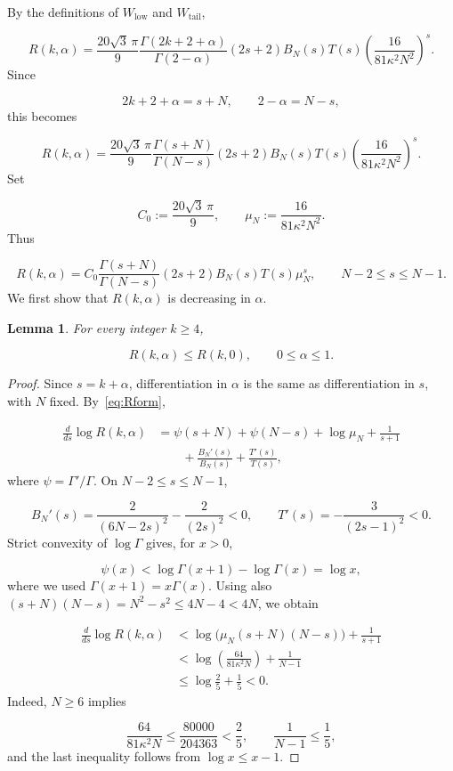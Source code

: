 \documentclass[11pt]{article}
\theoremstyle{plain}
\newtheorem{lemma}[theorem]{Lemma}
\theoremstyle{definition}
\theoremstyle{remark}
\begin{document}
By the definitions of $W_{\mathrm{low}}$ and $W_{\mathrm{tail}}$,

\[
  R(k,\alpha ) = \frac{20\sqrt{3}\, \pi }{9} \frac{\Gamma (2k+2+\alpha )}{\Gamma (2-\alpha )} (2s+2) B_N(s) T(s) \left( \frac{16}{81\kappa^{2}N^{2}} \right)^{s} .
\]
Since

\[
  2k+2+\alpha = s+N , \qquad  2-\alpha = N-s ,
\]
this becomes

\[
  R(k,\alpha ) = \frac{20\sqrt{3}\, \pi }{9} \frac{\Gamma (s+N)}{\Gamma (N-s)} (2s+2) B_N(s) T(s) \left( \frac{16}{81\kappa^{2}N^{2}} \right)^{s} .
\]
Set

\[
  C_{0} := \frac{20\sqrt{3}\, \pi }{9} , \qquad  \mu_N := \frac{16}{81\kappa^{2}N^{2}} .
\]
Thus

\begin{equation}\label{eq:Rform}
  R(k,\alpha ) = C_{0} \frac{\Gamma (s+N)}{\Gamma (N-s)} (2s+2) B_N(s) T(s) \mu_N^{s} , \qquad  N-2 \le s \le N-1 .
\end{equation}
We first show that $R(k,\alpha )$ is decreasing in $\alpha$.

\begin{lemma}\label{res:6.1}
For every integer $k \ge 4$,

\[
  R(k,\alpha ) \le R(k,0) , \qquad  0 \le \alpha \le 1 .
\]
\end{lemma}

\begin{proof}
Since $s = k+\alpha$, differentiation in $\alpha$ is the same as differentiation in $s$, with $N$ fixed. By~\eqref{eq:Rform},

\begin{align*}
  \frac{d}{ds}\log R(k,\alpha ) &= \psi (s+N) + \psi (N-s) + \log \mu_N + \frac{1}{s+1} \\
  &\qquad + \frac{B_N'(s)}{B_N(s)} + \frac{T'(s)}{T(s)} ,
\end{align*}
where $\psi = \Gamma '/\Gamma$. On $N-2 \le s \le N-1$,

\[
  B_N'(s) = \frac{2}{(6N-2s)^{2}} - \frac{2}{(2s)^{2}} < 0 , \qquad  T'(s) = -\frac{3}{(2s-1)^{2}} < 0 .
\]
Strict convexity of $\log \Gamma$ gives, for $x > 0$,

\[
  \psi (x) < \log \Gamma (x+1) - \log \Gamma (x) = \log x ,
\]
where we used $\Gamma (x+1) = x\Gamma (x)$. Using also $(s+N)(N-s) = N^{2}-s^{2} \le 4N-4 < 4N$, we obtain

\begin{align*}
  \frac{d}{ds}\log R(k,\alpha ) &< \log \big( \mu_N(s+N)(N-s) \big) + \frac{1}{s+1} \\
  &< \log \left( \frac{64}{81\kappa^{2}N} \right) + \frac{1}{N-1} \\
  &\le \log \frac{2}{5} + \frac{1}{5} < 0 .
\end{align*}
Indeed, $N \ge 6$ implies

\[
  \frac{64}{81\kappa^{2}N} \le \frac{80000}{204363} < \frac{2}{5} , \qquad  \frac{1}{N-1} \le \frac{1}{5} ,
\]
and the last inequality follows from $\log x \le x-1$.
\end{proof}
\end{document}
